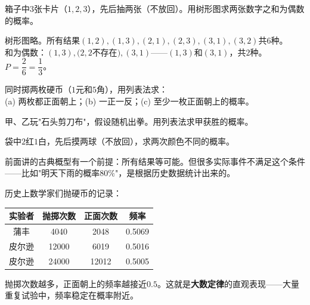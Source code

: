 \begin{center}
\end{center}


\begin{example}
箱子中$3$张卡片（$1,2,3$），先后抽两张（不放回）。用树形图求两张数字之和为偶数的概率。
\end{example}
\begin{solution}
树形图略。所有结果$(1,2),(1,3),(2,1),(2,3),(3,1),(3,2)$共$6$种。\\
和为偶数：$(1,3),(2,2$不存在$),(3,1)$——$(1,3)$和$(3,1)$，共$2$种。\\
$P=\dfrac{2}{6}=\dfrac13$。
\end{solution}

\begin{exercise}
\item 同时掷两枚硬币（$1$元和$5$角），用列表法求：\\
(a) 两枚都正面朝上；(b) 一正一反；(c) 至少一枚正面朝上的概率。
\item 甲、乙玩"石头剪刀布"，假设随机出拳。用列表法求甲获胜的概率。
\item 袋中$2$红$1$白，先后摸两球（不放回），求两次颜色不同的概率。
\end{exercise}


前面讲的古典概型有一个前提：所有结果等可能。但很多实际事件不满足这个条件——比如"明天下雨的概率$80\%$"，是根据历史数据统计出来的。

\begin{example}
历史上数学家们抛硬币的记录：
\end{example}
\begin{center}
\begin{tabular}{c|c|c|c}
实验者 & 抛掷次数 & 正面次数 & 频率\\\hline
蒲丰 & 4040 & 2048 & 0.5069\\
皮尔逊 & 12000 & 6019 & 0.5016\\
皮尔逊 & 24000 & 12012 & 0.5005
\end{tabular}
\end{center}
抛掷次数越多，正面朝上的频率越接近$0.5$。这就是\textbf{大数定律}的直观表现——大量重复试验中，频率稳定在概率附近。

